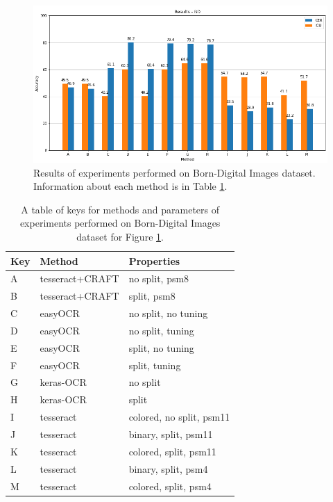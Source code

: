 {
\begin{figure}[hbt!]
    \centering
    \includegraphics[scale=0.5]{obrazky/grafy/resBD.png}
    \caption{Results of experiments performed on Born-Digital Images dataset. Information about each method is in Table \ref*{Tab:resBD}.}
    \label{Im:resBD}
\end{figure}
\begin{table}[!hbt]
    \centering
    \begin{tabular}{|l|l|l|}
    \hline
        Key & Method & Properties \\ \hline
        A & tesseract+CRAFT &  no split, psm8\\ 
        B & tesseract+CRAFT &  split, psm8\\ \hline
        C & easyOCR &  no split, no tuning\\ 
        D & easyOCR &  no split, tuning\\ 
        E & easyOCR &  split, no tuning\\ 
        F & easyOCR &  split, tuning\\ \hline
        G & keras-OCR &  no split\\ 
        H & keras-OCR &  split\\ \hline
        I & tesseract & colored, no split, psm11\\ 
        J & tesseract & binary, split, psm11\\ 
        K & tesseract & colored, split, psm11\\ 
        L & tesseract & binary, split, psm4\\ 
        M & tesseract & colored, split, psm4\\ \hline
    \end{tabular}
    \caption{A table of keys for methods and parameters of experiments performed on Born-Digital Images dataset for Figure \ref*{Im:resBD}.}
    \label{Tab:resBD}
\end{table}
}

